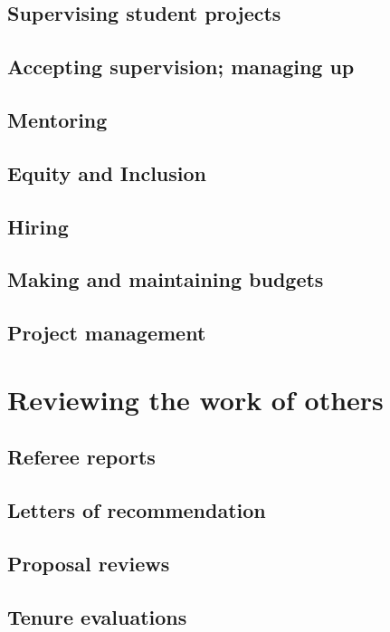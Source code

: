 \documentclass[12pt,letterpaper]{book}
\begin{document}
\chapter{Supervising student projects}

\chapter{Accepting supervision; managing up}

\chapter{Mentoring}

\chapter{Equity and Inclusion}

\chapter{Hiring}

\chapter{Making and maintaining budgets}

\chapter{Project management}

\part{Reviewing the work of others}

\chapter{Referee reports}

\chapter{Letters of recommendation}

\chapter{Proposal reviews}

\chapter{Tenure evaluations}
\end{document}
